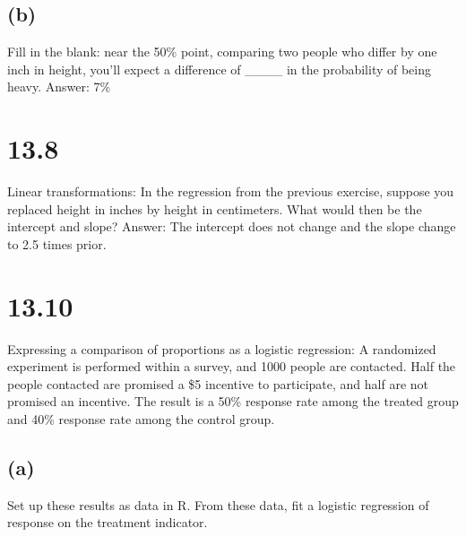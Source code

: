 \documentclass[
]{article}
\begin{document}
\hypertarget{b-1}{%
\subsection{(b)}\label{b-1}}

Fill in the blank: near the 50\% point, comparing two people who differ
by one inch in height, you'll expect a difference of \_\_\_\_ in the
probability of being heavy. Answer: 7\%

\hypertarget{section-2}{%
\section{13.8}\label{section-2}}

Linear transformations: In the regression from the previous exercise,
suppose you replaced height in inches by height in centimeters. What
would then be the intercept and slope? Answer: The intercept does not
change and the slope change to 2.5 times prior.

\hypertarget{section-3}{%
\section{13.10}\label{section-3}}

Expressing a comparison of proportions as a logistic regression: A
randomized experiment is performed within a survey, and 1000 people are
contacted. Half the people contacted are promised a \$5 incentive to
participate, and half are not promised an incentive. The result is a
50\% response rate among the treated group and 40\% response rate among
the control group.

\hypertarget{a-2}{%
\subsection{(a)}\label{a-2}}

Set up these results as data in R. From these data, fit a logistic
regression of response on the treatment indicator.
\end{document}
